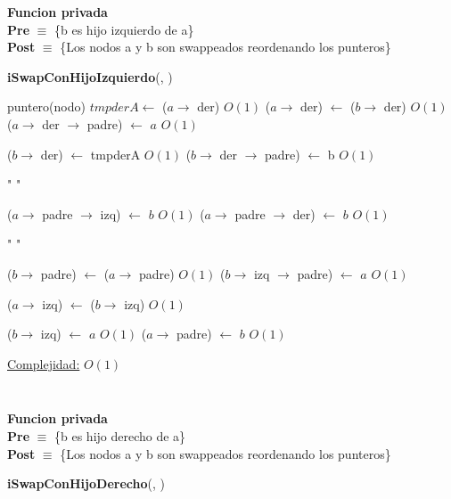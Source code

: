 \begin{Algoritmos}
\textbf{Funcion privada}\\
\textbf{Pre} $\equiv$ \{b es hijo izquierdo de a\}\\%
\textbf{Post} $\equiv$ \{Los nodos a y b son swappeados reordenando los punteros\}%
\begin{algorithm}[H]
{\textbf{iSwapConHijoIzquierdo}(, )}
\begin{algorithmic}[1]

    \State puntero(nodo) $tmpderA \gets$ ($a \to$ der) \Comment $O(1)$
    \State ($a \to$ der) $\gets$ ($b \to$ der)  \Comment $O(1)$
        \State ($a \to$ der $\to$ padre) $\gets$ $a$ \Comment $O(1)$
    \EndIf

    \State ($b \to$ der) $\gets$ tmpderA  \Comment $O(1)$
        \State ($b \to$ der $\to$ padre) $\gets$ b  \Comment $O(1)$
    \EndIf
    
    \State " "

        \State ($a \to$ padre $\to$ izq) $\gets$ $b$ \Comment $O(1)$
    \Else {}
        \State ($a \to$ padre $\to$ der) $\gets$ $b$ \Comment $O(1)$
    \EndIf
    \EndIf
    
    \State " "

    \State ($b \to$ padre) $\gets$ ($a \to$ padre) \Comment $O(1)$
        \State ($b \to$ izq $\to$ padre) $\gets$ $a$ \Comment $O(1)$
    \EndIf
    
    \State ($a \to$ izq) $\gets$ ($b \to$ izq) \Comment $O(1)$
    
    \State ($b \to$ izq) $\gets$ $a$ \Comment $O(1)$
    \State ($a \to$ padre) $\gets$ $b$ \Comment $O(1)$


    \medskip
    \Statex \underline{Complejidad:} $O(1)$

\end{algorithmic}
\end{algorithm}

$ $\newline


$ $\newline

\textbf{Funcion privada}\\
\textbf{Pre} $\equiv$ \{b es hijo derecho de a\}\\%
\textbf{Post} $\equiv$ \{Los nodos a y b son swappeados reordenando los punteros\}%
\begin{algorithm}[H]
{\textbf{iSwapConHijoDerecho}(, )}
\begin{algorithmic}[1]


\end{algorithmic}
\end{algorithm}
\end{Algoritmos}
